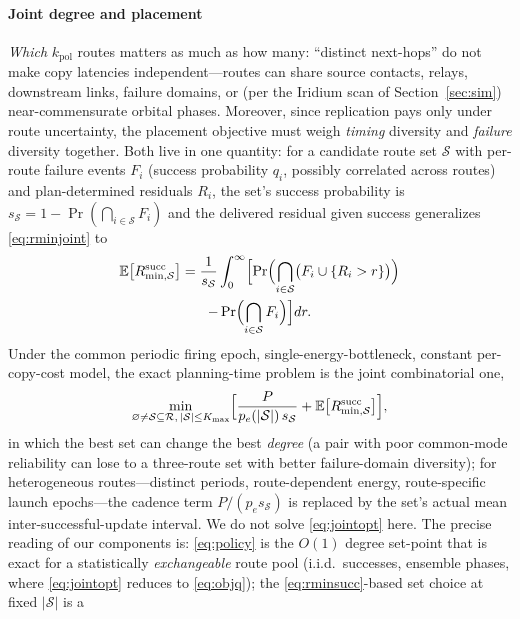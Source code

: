 \documentclass[twocolumn,3p,times,procedia]{elsarticle}
\newcommand{\E}{\mathbb{E}}
\newcommand{\peff}{p_e}
\begin{document}
\paragraph*{Joint degree and placement}
\emph{Which} $k_{\mathrm{pol}}$ routes matters as much as how many:
``distinct next-hops'' do not make copy latencies independent---routes
can share source contacts, relays, downstream links, failure domains,
or (per the Iridium scan of Section~\ref{sec:sim}) near-commensurate
orbital phases. Moreover, since replication pays only under route
uncertainty, the placement objective must weigh \emph{timing}
diversity and \emph{failure} diversity together. Both live in one
quantity: for a candidate route set $\mathcal{S}$ with per-route
failure events
$F_i$ (success probability $q_i$, possibly correlated across
routes) and plan-determined residuals $R_i$, the set's success
probability is $s_{\mathcal{S}}=1-\Pr(\bigcap_{i\in\mathcal{S}}F_i)$
and the delivered
residual given success generalizes \eqref{eq:rminjoint} to
\begin{multline}\label{eq:rminsucc}
\E\bigl[R^{\mathrm{succ}}_{\min,\mathcal{S}}\bigr]=\frac{1}{s_{\mathcal{S}}}
\int_0^\infty\Bigl[\Pr\Bigl(\bigcap_{i\in\mathcal{S}}
\bigl(F_i\cup\{R_i>r\}\bigr)\Bigr)\\
-\Pr\Bigl(\bigcap_{i\in\mathcal{S}}F_i\Bigr)\Bigr]dr.
\end{multline}
Under the common periodic firing epoch, single-energy-bottleneck,
constant per-copy-cost model, the exact planning-time problem is the
joint combinatorial one,
\begin{equation}\label{eq:jointopt}
\min_{\varnothing\ne\mathcal{S}\subseteq\mathcal{R},\,
|\mathcal{S}|\le K_{\max}}
\Bigl[\frac{P}{\peff(|\mathcal{S}|)\,s_{\mathcal{S}}}
+\E\bigl[R^{\mathrm{succ}}_{\min,\mathcal{S}}\bigr]\Bigr],
\end{equation}
in which the best set can change the best \emph{degree} (a pair with
poor common-mode reliability can lose to a three-route set with better
failure-domain diversity); for heterogeneous routes---distinct periods,
route-dependent energy, route-specific launch epochs---the cadence term
$P/(\peff s_{\mathcal{S}})$ is replaced by the set's actual mean
inter-successful-update interval. We do not solve \eqref{eq:jointopt}
here.
The precise reading of our components is: \eqref{eq:policy} is the
$O(1)$ degree set-point that is exact for a statistically
\emph{exchangeable} route pool (i.i.d.\ successes, ensemble phases,
where \eqref{eq:jointopt} reduces to \eqref{eq:objq}); the
\eqref{eq:rminsucc}-based set choice at fixed $|\mathcal{S}|$ is a
\end{document}
